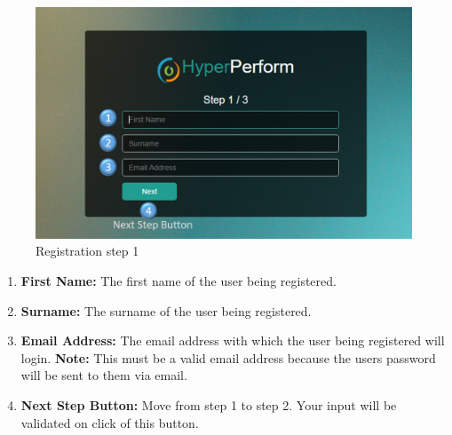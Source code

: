 \documentclass[11pt,a4paper]{article}
\begin{document}
\begin{figure}[H]
	\begin{center}
		\includegraphics[scale=0.35]{../Images/Getting_Started/Step_1_numbered}
		\caption{Registration step 1}
	\end{center}
\end{figure}
\begin{enumerate}
	\item \textbf{First Name:} The first name of the user being registered.
	\item \textbf{Surname:} The surname of the user being registered.
	\item \textbf{Email Address:} The email address with which the user being registered will login. \textbf{Note:} This must be a valid email address because the users password will be sent to them via email. 
	\item \textbf{Next Step Button:} Move from step 1 to step 2. Your input will be validated on click of this button. 
\end{enumerate}
\end{document}
